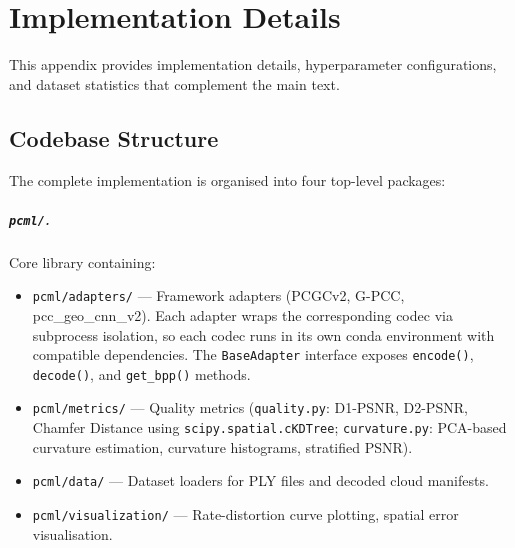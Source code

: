 \chapter{Implementation Details}
\label{app:implementation}

This appendix provides implementation details, hyperparameter configurations,
and dataset statistics that complement the main text.

\section{Codebase Structure}
\label{app:codebase}

The complete implementation is organised into four top-level packages:

\paragraph{\texttt{pcml/}.}
Core library containing:
\begin{itemize}
  \item \texttt{pcml/adapters/} --- Framework adapters (PCGCv2, G-PCC,
    pcc\_geo\_cnn\_v2). Each adapter wraps the corresponding codec via subprocess
    isolation, so each codec runs in its own conda environment with compatible
    dependencies. The \texttt{BaseAdapter} interface exposes
    \texttt{encode()}, \texttt{decode()}, and \texttt{get\_bpp()} methods.

  \item \texttt{pcml/metrics/} --- Quality metrics (\texttt{quality.py}: D1-PSNR,
    D2-PSNR, Chamfer Distance using \texttt{scipy.spatial.cKDTree};
    \texttt{curvature.py}: PCA-based curvature estimation, curvature histograms,
    stratified PSNR).

  \item \texttt{pcml/data/} --- Dataset loaders for PLY files and decoded cloud
    manifests.

  \item \texttt{pcml/visualization/} --- Rate-distortion curve plotting, spatial
    error visualisation.
\end{itemize}

